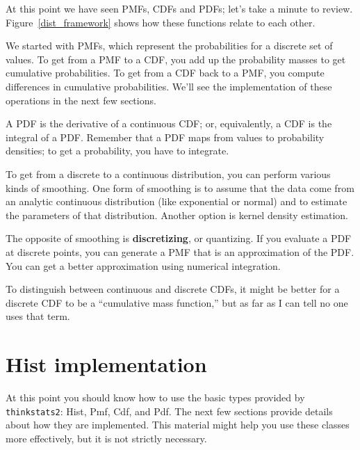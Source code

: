 At this point we have seen PMFs, CDFs and PDFs; let's take a minute
to review.  Figure~\ref{dist_framework} shows how these functions relate
to each other.

We started with PMFs, which represent the probabilities for a discrete
set of values.  To get from a PMF to a CDF, you add up the probability
masses to get cumulative probabilities.  
To get from a CDF back to a PMF, you compute differences in cumulative
probabilities.  We'll see the implementation of these operations
in the next few sections.

A PDF is the derivative of a continuous CDF; or, equivalently,
a CDF is the integral of a PDF.  Remember that a PDF maps from
values to probability densities; to get a probability, you have to
integrate.

To get from a discrete to a continuous distribution, you can perform
various kinds of smoothing.  One form of smoothing is to assume that
the data come from an analytic continuous distribution
(like exponential or normal) and to estimate the parameters of that
distribution.  Another option is kernel density estimation.

The opposite of smoothing is {\bf discretizing}, or quantizing.  If you
evaluate a PDF at discrete points, you can generate a PMF that is an
approximation of the PDF.  You can get a better approximation using
numerical integration.  

To distinguish between continuous and discrete CDFs, it might be
better for a discrete CDF to be a ``cumulative mass function,'' but as
far as I can tell no one uses that term.  



\section{Hist implementation}

At this point you should know how to use the basic types provided
by {\tt thinkstats2}: Hist, Pmf, Cdf, and Pdf.  The next few sections
provide details about how they are implemented.  This material
might help you use these classes more effectively, but it is not
strictly necessary.

